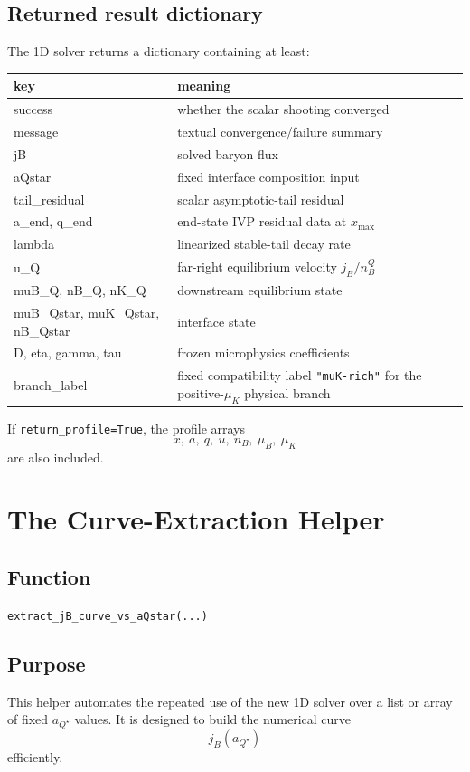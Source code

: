 \documentclass[11pt]{article}
\begin{document}
\subsection{Returned result dictionary}
The 1D solver returns a dictionary containing at least:
\begin{center}
\begin{tabular}{>{\ttfamily}p{}p{}}
\toprule
key & meaning \\
\midrule
success & whether the scalar shooting converged \\
message & textual convergence/failure summary \\
jB & solved baryon flux \\
aQstar & fixed interface composition input \\
tail\_residual & scalar asymptotic-tail residual \\
a\_end, q\_end & end-state IVP residual data at $x_{\max}$ \\
lambda & linearized stable-tail decay rate \\
u\_Q & far-right equilibrium velocity $j_B/n_B^Q$ \\
muB\_Q, nB\_Q, nK\_Q & downstream equilibrium state \\
muB\_Qstar, muK\_Qstar, nB\_Qstar & interface state \\
D, eta, gamma, tau & frozen microphysics coefficients \\
branch\_label & fixed compatibility label \texttt{"muK-rich"} for the
positive-$\mu_K$ physical branch \\
\bottomrule
\end{tabular}
\end{center}

If \texttt{return\_profile=True}, the profile arrays
\[
x,\ a,\ q,\ u,\ n_B,\ \mu_B,\ \mu_K
\]
are also included.

\section{The Curve-Extraction Helper}
\subsection{Function}
\texttt{extract\_jB\_curve\_vs\_aQstar(...)}

\subsection{Purpose}
This helper automates the repeated use of the new 1D solver over a list or array
of fixed $a_{Q^\star}$ values. It is designed to build the numerical curve
\[
j_B(a_{Q^\star})
\]
efficiently.
\end{document}
